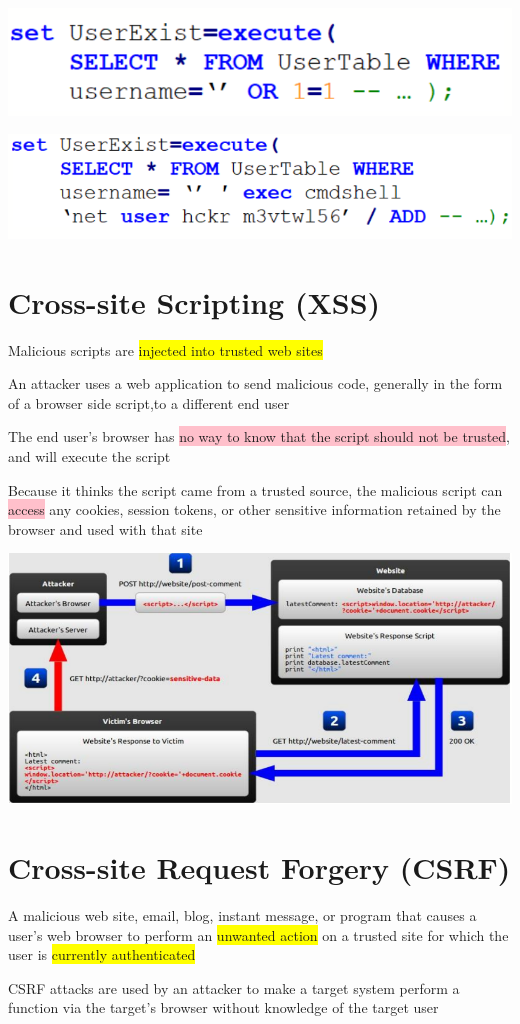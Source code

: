 \documentclass[]{project_plan}
\begin{document}
\includegraphics[width=.6\linewidth]{sql i eg2 2}

\includegraphics[width=.6\linewidth]{sql i eg3.png}

\section{Cross-site Scripting (XSS)}

Malicious scripts are \colorbox{yellow}{injected into trusted web sites}

An attacker uses a web application to send malicious code, generally in the form of a browser
side script,to a different end user

The end user’s browser has \colorbox{pink}{no way to know that the script should not be trusted}, and will
execute the script

Because it thinks the script came from a trusted source, the malicious script can \colorbox{pink}{access} any
cookies, session tokens, or other sensitive information retained by the browser and used with that
site

\includegraphics[width=.6\linewidth]{xss.png}

\section{Cross-site Request Forgery (CSRF)}

A malicious web site, email, blog, instant message, or program that causes a user’s web browser
to perform an \colorbox{yellow}{unwanted action} on a trusted site for which the user is \colorbox{yellow}{currently authenticated}

CSRF attacks are used by an attacker to make a target system perform a function via the
target’s browser without knowledge of the target user
\end{document}
